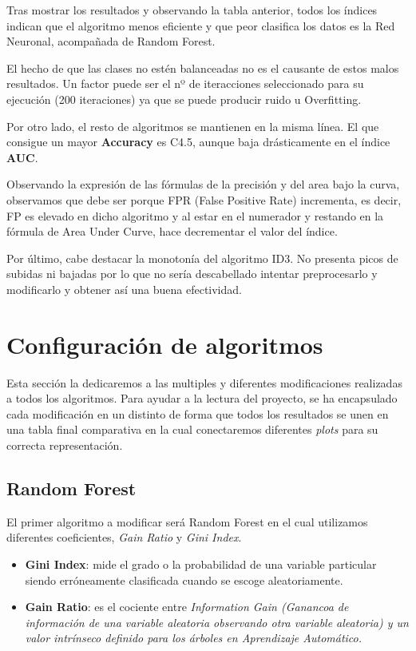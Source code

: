 	Tras mostrar los resultados y observando la tabla anterior, todos los índices indican que el algoritmo menos eficiente y que peor clasifica los datos es la Red Neuronal, acompañada de Random Forest. 
	
	El hecho de que las clases no estén balanceadas no es el causante de estos malos resultados. Un factor puede ser el nº de iteracciones seleccionado para su ejecución (200 iteraciones) ya que se puede producir ruido u Overfitting.
	
	Por otro lado, el resto de algoritmos se mantienen en la misma línea. El que consigue un mayor \textbf{Accuracy} es C4.5, aunque baja drásticamente en el índice \textbf{AUC}. 
	
	Observando la expresión de las fórmulas de la precisión y del area bajo la curva, observamos que debe ser porque FPR (False Positive Rate) incrementa, es decir, FP es elevado en dicho algoritmo y al estar en el numerador y restando en la fórmula de Area Under Curve, hace decrementar el valor del índice.
	
	Por último, cabe destacar la monotonía del algoritmo ID3. No presenta picos de subidas ni bajadas por lo que no sería descabellado intentar preprocesarlo y modificarlo y obtener así una buena efectividad.
	


	

	\newpage 
	\section{Configuración de algoritmos}
	\hspace{1cm} Esta sección la dedicaremos a las multiples y diferentes modificaciones realizadas a todos los algoritmos. 
	Para ayudar a la lectura del proyecto, se ha encapsulado cada modificación en un distinto de forma que todos los resultados se unen en una tabla final comparativa en la cual conectaremos diferentes \textit{plots} para su correcta representación.

	
	
	\subsection{Random Forest}
	
	\hspace{1cm} El primer algoritmo a modificar será Random Forest en el cual utilizamos diferentes coeficientes, \textit{Gain Ratio} y \textit{Gini Index}.
	
	\begin{itemize}
		\item \textbf{Gini Index}: mide el grado o la probabilidad de una variable particular siendo erróneamente clasificada cuando se escoge aleatoriamente.
		\item \textbf{Gain Ratio}: es el cociente entre \textit{Information Gain (Ganancoa de información de una variable aleatoria observando otra variable aleatoria) y un valor intrínseco definido para los árboles en Aprendizaje Automático. }
		
	\end{itemize}
	

